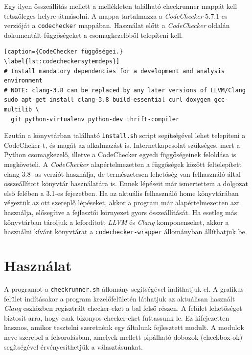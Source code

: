 \documentclass[a4paper,12pt]{report}
\begin{document}
Egy ilyen összeállítás mellett a mellékleten található checkrunner mappát kell tetszőleges helyre átmásolni. A mappa tartalmazza a \emph{CodeChecker} 5.7.1-es verzióját a \texttt{codechecker} mappában. Használat előtt a \emph{CodeChecker} oldalán dokumentált függőségeket a csomagkezelőből telepíteni kell.

\begin{lstlisting}[caption={CodeChecker függőségei.}
\label{lst:codecheckersytemdeps}]
# Install mandatory dependencies for a development and analysis environment
# NOTE: clang-3.8 can be replaced by any later versions of LLVM/Clang
sudo apt-get install clang-3.8 build-essential curl doxygen gcc-multilib \
  git python-virtualenv python-dev thrift-compiler
\end{lstlisting}

Ezután a könyvtárban található \texttt{install.sh} script segítségével lehet telepíteni a CodeCheker-t, és magát az alkalmazást is. Internetkapcsolat szükséges, mert a Python csomagkezelő, illetve a CodeChecker egyedi függőségeinek feloldása is megköveteli. A \emph{CodeChecker} alapértelmezetten a függőségek között feltelepített clang-3.8 -as verziót használja, de természetesen lehetőség van felhasználó által összeállított könyvtár használatára is. Ennek lépéseit már ismertettem a dolgozat első felében a 3.1-es fejezetben. Ha az aktuális felhasználó home könyvtárában végeztük az ott szereplő lépéseket, akkor a program már alapértelmezetten azt használja, elősegítve a fejlesztői környezet gyors összeállítását. Ha esetleg más könyvtárban tároljuk a lefordított \emph{LLVM} és \emph{Clang} komponenseket, akkor a használni kívánt könyvtárat a \texttt{codechecker-wrapper} állományban állíthatjuk be.

\section{Használat}
A programot a \texttt{checkrunner.sh} állomány segítségével indíthatjuk el. A grafikus felület indításakor a program kezelőfelületén láthatjuk az aktuálisan használt \emph{Clang} eszközben regisztrált checker-eket a bal felső részen. A felület lehetőséget biztosít arra, hogy csak bizonyos checker-eket futtassunk le. Ez kifejezetten hasznos, amikor tesztelni szeretnénk egy általunk fejlesztett modult. A modulok neve szerepel a felsorolásban, amelyek mellett pipálható dobozok (checkbox-ok) segítségével érvényesíthetjük a választásunkat.
\end{document}
